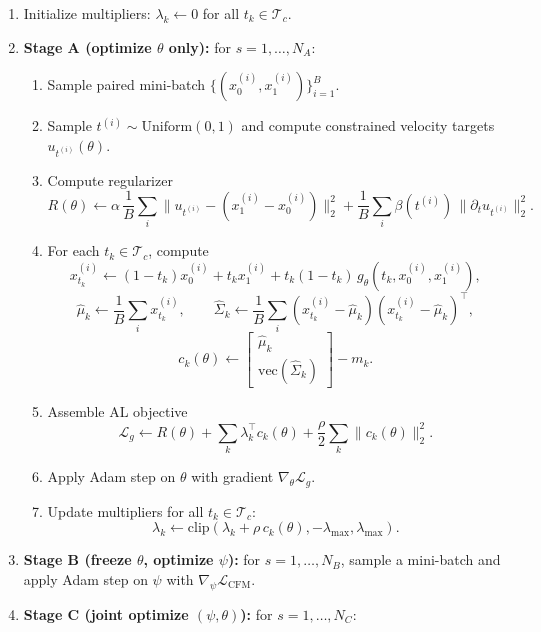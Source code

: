 \documentclass[11pt]{article}
\begin{document}
\begin{enumerate}
    \item Initialize multipliers: $\lambda_k \gets 0$ for all $t_k\in\mathcal{T}_c$.
    \item \textbf{Stage A (optimize $\theta$ only):} for $s=1,\dots,N_A$:
    \begin{enumerate}
        \item Sample paired mini-batch $\{(x_0^{(i)},x_1^{(i)})\}_{i=1}^B$.
        \item Sample $t^{(i)}\sim\mathrm{Uniform}(0,1)$ and compute constrained velocity targets $u_{t^{(i)}}(\theta)$.
        \item Compute regularizer
        \[
        R(\theta)\gets
        \alpha\,\frac{1}{B}\sum_i\|u_{t^{(i)}}-(x_1^{(i)}-x_0^{(i)})\|_2^2
        +\frac{1}{B}\sum_i \beta(t^{(i)})\,\|\partial_t u_{t^{(i)}}\|_2^2.
        \]
        \item For each $t_k\in\mathcal{T}_c$, compute
        \[
        x_{t_k}^{(i)}\gets
        (1-t_k)x_0^{(i)}+t_kx_1^{(i)}+t_k(1-t_k)\,g_\theta(t_k,x_0^{(i)},x_1^{(i)}),
        \]
        \[
        \hat{\mu}_k\gets \frac{1}{B}\sum_i x_{t_k}^{(i)},\qquad
        \hat{\Sigma}_k\gets \frac{1}{B}\sum_i(x_{t_k}^{(i)}-\hat{\mu}_k)(x_{t_k}^{(i)}-\hat{\mu}_k)^\top,
        \]
        \[
        c_k(\theta)\gets
        \begin{bmatrix}
        \hat{\mu}_k\\
        \mathrm{vec}(\hat{\Sigma}_k)
        \end{bmatrix}
        -m_k.
        \]
        \item Assemble AL objective
        \[
        \mathcal{L}_g\gets
        R(\theta)+\sum_k\lambda_k^\top c_k(\theta)+\frac{\rho}{2}\sum_k\|c_k(\theta)\|_2^2.
        \]
        \item Apply Adam step on $\theta$ with gradient $\nabla_\theta\mathcal{L}_g$.
        \item Update multipliers for all $t_k\in\mathcal{T}_c$:
        \[
        \lambda_k\gets
        \mathrm{clip}\!\left(\lambda_k+\rho\,c_k(\theta),-\lambda_{\max},\lambda_{\max}\right).
        \]
    \end{enumerate}
    \item \textbf{Stage B (freeze $\theta$, optimize $\psi$):} for $s=1,\dots,N_B$, sample a mini-batch and apply Adam step on $\psi$ with $\nabla_\psi\mathcal{L}_{\mathrm{CFM}}$.
    \item \textbf{Stage C (joint optimize $(\psi,\theta)$):} for $s=1,\dots,N_C$:

\end{enumerate}
\end{document}
